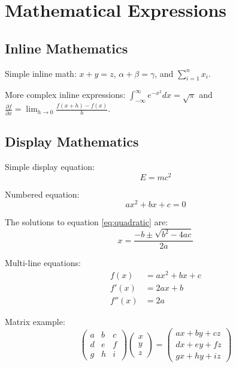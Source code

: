 \documentclass[12pt,a4paper,twoside]{article}
\begin{document}
\section{Mathematical Expressions}

\subsection{Inline Mathematics}

Simple inline math: $x + y = z$, $\alpha + \beta = \gamma$, and $\sum_{i=1}^{n} x_i$.

More complex inline expressions: $\int_{-\infty}^{\infty} e^{-x^2} dx = \sqrt{\pi}$ and $\frac{\partial f}{\partial x} = \lim_{h \to 0} \frac{f(x+h) - f(x)}{h}$.

\subsection{Display Mathematics}

Simple display equation:
$$E = mc^2$$

Numbered equation:
\begin{equation}
\label{eq:quadratic}
ax^2 + bx + c = 0
\end{equation}

The solutions to equation \ref{eq:quadratic} are:
\begin{equation}
x = \frac{-b \pm \sqrt{b^2 - 4ac}}{2a}
\end{equation}

Multi-line equations:
\begin{align}
f(x) &= ax^2 + bx + c \\
f'(x) &= 2ax + b \\
f''(x) &= 2a
\end{align}

Matrix example:
$$
\begin{pmatrix}
a & b & c \\
d & e & f \\
g & h & i
\end{pmatrix}
\begin{pmatrix}
x \\
y \\
z
\end{pmatrix}
=
\begin{pmatrix}
ax + by + cz \\
dx + ey + fz \\
gx + hy + iz
\end{pmatrix}
$$
\end{document}
